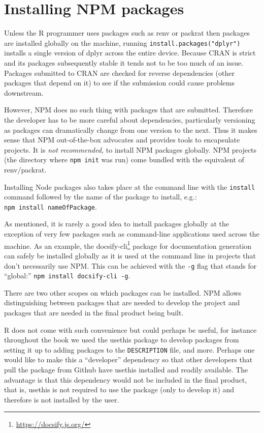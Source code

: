 \documentclass[10pt,]{krantz}
\renewcommand{\href}[2]{#2\footnote{\url{#1}}}
\begin{document}
\hypertarget{webpack-intro-install-pkgs}{%
\section{Installing NPM packages}\label{webpack-intro-install-pkgs}}

Unless the R programmer uses packages such as renv \citep{R-renv} or packrat \citep{R-packrat} then packages are installed globally on the machine, running \texttt{install.packages("dplyr")} installs a single version of dplyr across the entire device. Because CRAN is strict and its packages subsequently stable it tends not to be too much of an issue. Packages submitted to CRAN are checked for reverse dependencies (other packages that depend on it) to see if the submission could cause problems downstream.

However, NPM does no such thing with packages that are submitted. Therefore the developer has to be more careful about dependencies, particularly versioning as packages can dramatically change from one version to the next. Thus it makes sense that NPM out-of-the-box advocates and provides tools to encapsulate projects. It is \emph{not recommended,} to install NPM packages globally. NPM projects (the directory where \texttt{npm\ init} was run) come bundled with the equivalent of renv/packrat.

Installing Node packages also takes place at the command line with the \texttt{install} command followed by the name of the package to install, e.g.: \texttt{npm\ install\ nameOfPackage}.

As mentioned, it is rarely a good idea to install packages globally at the exception of very few packages such as command-line applications used across the machine. As an example, the \href{https://docsify.js.org/}{docsify-cli} package for documentation generation can safely be installed globally as it is used at the command line in projects that don't necessarily use NPM. This can be achieved with the \texttt{-g} flag that stands for ``global:'' \texttt{npm\ install\ docsify-cli\ -g}.

There are two other scopes on which packages can be installed. NPM allows distinguishing between packages that are needed to develop the project and packages that are needed in the final product being built.

R does not come with such convenience but could perhaps be useful, for instance throughout the book we used the usethis package to develop packages from setting it up to adding packages to the \texttt{DESCRIPTION} file, and more. Perhaps one would like to make this a ``developer'' dependency so that other developers that pull the package from Github have usethis installed and readily available. The advantage is that this dependency would not be included in the final product, that is, usethis is not required to use the package (only to develop it) and therefore is not installed by the user.
\end{document}
